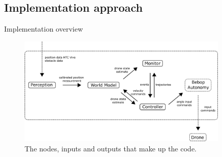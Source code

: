 \subsection{Implementation approach}
\label{subsec:Impl}

\begin{frame}{Implementation overview}

    \begin{figure}[h]
    \centering
    \includegraphics[width=10cm]{Figures/code_structure.png}
    \caption{The nodes, inputs and outputs that make up the code.}
    \label{fig:code_struct}
    \end{figure}
    		
\end{frame}